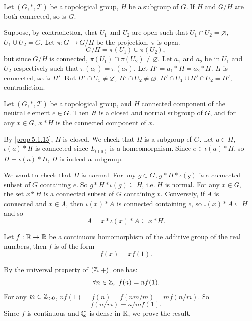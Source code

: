 \begin{propositionenv}
    Let $(G,*,\mathscr{T})$ be a topological group,
    $H$ be a subgroup of $G$.
    If $H$ and $G/H$ are both connected, so is $G$.
\end{propositionenv}
\begin{proofenv}
    Suppose, by contradiction, that $U_1$ and $U_2$ are open such that $U_1\cap U_2 = \varnothing$, $U_1 \cup U_2 = G$.
    Let $\pi : G \rightarrow G/H$ be the projection.
    $\pi$ is open.
    $$G/H = \pi(U_1) \cup \pi(U_2),$$
    but since $G/H$ is connected, $\pi(U_1) \cap \pi(U_2) \neq \varnothing.$
    Let $a_1$ and $a_2$ be in $U_1$ and $U_2$ respectively such that $\pi(a_1) = \pi(a_2)$.
    Let $H' = a_1 * H = a_2 * H$.
    $H$ is connected, so is $H'$.
    But $H' \cap U_1 \neq \varnothing$, $H' \cap U_2 \neq \varnothing$, $H' \cap U_1 \cup H' \cap U_2 = H'$, contradiction.
\end{proofenv}

\begin{propositionenv}
    Let $(G,*,\mathscr{T})$ be a topological group,
    and $H$ connected component of the neutral element $e \in G$.
    Then $H$ is a closed and normal subgroup of $G$,
    and for any $x \in G$, $x * H$ is the connected component of $x$.
\end{propositionenv}
\begin{proofenv}
    By \ref{prop:5.1.15}, $H$ is closed.
    We check that $H$ is a subgroup of $G$.
    Let $a \in H$, $\iota(a) * H$ is connected since $L_{\iota(a)}$ is a homeomorphism.
    Since $e \in \iota(a) * H$, so $H = \iota(a) * H$, $H$ is indeed a subgroup.
    
    \quad We want to check that $H$ is normal.
    For any $g \in G$, $g * H * \iota(g)$ is a connected subset of $G$ containing $e$.
    So $g * H * \iota(g) \subseteq H$, i.e. $H$ is normal.
    For any $x \in G$, the set $x * H$ is a connected subset of $G$ containing $x$.
    Conversely, if $A$ is connected and $x \in A$, then $\iota(x) * A$ is connected containing $e$,
    so $\iota(x) * A \subseteq H$ and so
    $$ A = x * \iota (x) * A \subseteq x * H.$$
\end{proofenv}

\begin{propositionenv}\label{prop:5.2.25}
    Let $f : \mathbb{R} \rightarrow \mathbb{R}$ be a continuous homomorphism of the additive group of the real numbers, then $f$ is of the form
    $$ f (x) = x f(1).$$
\end{propositionenv}
\begin{proofenv}
    By the universal property of $(\mathbb{Z}, +)$, one has:
    $$ \forall n \in \ZZ,\ f(n) = n f(1).$$
    For any $m \in \mathbb{Z}_{>0}$, $n f(1) = f(n) = f(nm/m) = m f(n/m)$.
    So
    $$ f(n/m) = n/m f(1).$$
    Since $f$ is continuous and $\mathbb{Q}$ is dense in $\mathbb{R}$, we prove the result.
\end{proofenv}


